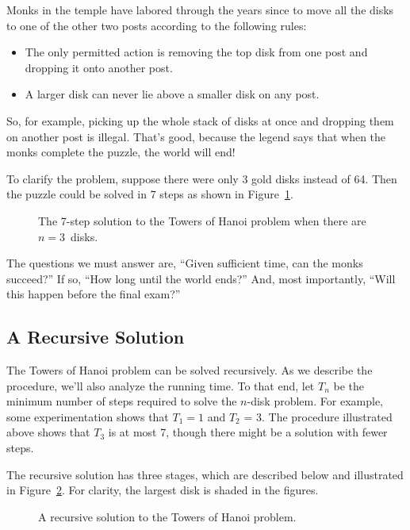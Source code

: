 Monks in the temple have labored through the years since to move all
the disks to one of the other two posts according to the following
rules:
\begin{itemize}
\item The only permitted action is removing the top disk from one post
and dropping it onto another post.
\item A larger disk can never lie above a smaller disk on any post.
\end{itemize}
So, for example, picking up the whole stack of disks at once
and dropping them on another post is illegal.  That's good, because
the legend says that when the monks complete the puzzle, the world
will end!

To clarify the problem, suppose there were only 3 gold disks instead
of 64.  Then the puzzle could be solved in 7 steps as shown in
Figure~\ref{fig:10A2}.

\begin{figure}


\caption{The 7-step solution to the Towers of Hanoi problem when there
are $n = 3$~disks.}

\label{fig:10A2}

\end{figure}

The questions we must answer are, ``Given sufficient time, can the
monks succeed?''  If so, ``How long until the world ends?''  And, most
importantly, ``Will this happen before the final exam?''

\subsection{A Recursive Solution}

The Towers of Hanoi problem can be solved recursively.  As we describe
the procedure, we'll also analyze the running time.  To that end, let
$T_n$ be the minimum number of steps required to solve the $n$-disk
problem.  For example, some experimentation shows that $T_1 = 1$ and
$T_2$ = 3.  The procedure illustrated above shows that $T_3$ is at
most 7, though there might be a solution with fewer steps.

The recursive solution has three stages, which are described below and
illustrated in Figure~\ref{fig:10A3}.
For clarity, the largest disk is shaded in the figures.

\begin{figure}


\caption{A recursive solution to the Towers of Hanoi problem.}

\label{fig:10A3}

\end{figure}

